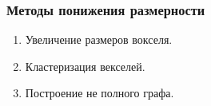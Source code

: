 \documentclass{beamer}
\begin{document}
	\begin{frame} 
		\frametitle{Методы понижения размерности}				
		\begin{enumerate}				
			\item Увеличение размеров вокселя.
			\item Кластеризация векселей.
			\item Построение не полного графа.					
		\end{enumerate}
		
		\begin{figure}
			
		\end{figure}	
	\end{frame}
		
		
\end{document}
